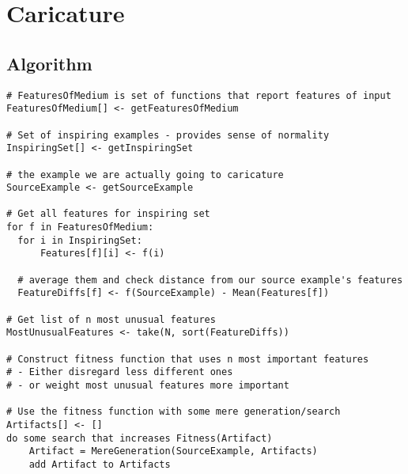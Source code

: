 \documentclass[11pt]{article}
\author{Tristan Strange}
\date{\today}
\title{}
\begin{document}
\tableofcontents

\section{Caricature}
\label{sec:org10e9e78}
\subsection{Algorithm}
\label{sec:orgb7b1c35}

\begin{verbatim}
# FeaturesOfMedium is set of functions that report features of input
FeaturesOfMedium[] <- getFeaturesOfMedium

# Set of inspiring examples - provides sense of normality
InspiringSet[] <- getInspiringSet

# the example we are actually going to caricature
SourceExample <- getSourceExample

# Get all features for inspiring set
for f in FeaturesOfMedium:
  for i in InspiringSet:
      Features[f][i] <- f(i)

  # average them and check distance from our source example's features
  FeatureDiffs[f] <- f(SourceExample) - Mean(Features[f])

# Get list of n most unusual features 
MostUnusualFeatures <- take(N, sort(FeatureDiffs))

# Construct fitness function that uses n most important features
# - Either disregard less different ones
# - or weight most unusual features more important

# Use the fitness function with some mere generation/search
Artifacts[] <- []
do some search that increases Fitness(Artifact)
    Artifact = MereGeneration(SourceExample, Artifacts)
    add Artifact to Artifacts
\end{verbatim}
\end{document}
